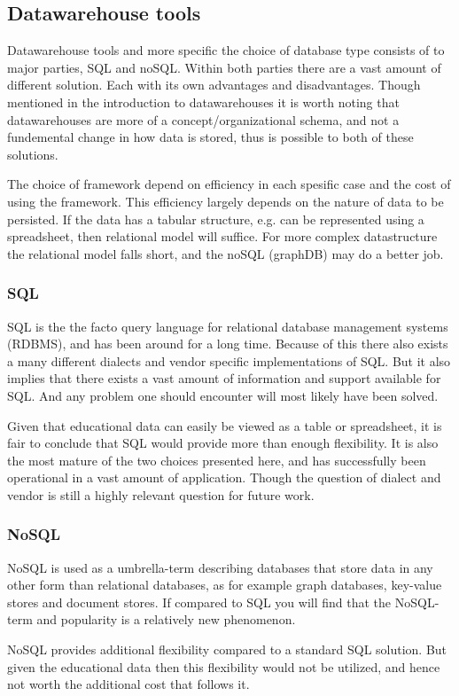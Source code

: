 \subsection{Datawarehouse tools}
Datawarehouse tools and more specific the choice of database type consists of to major parties, SQL and noSQL. 
Within both parties there are a vast amount of different solution. Each with its own advantages and disadvantages. 
Though mentioned in the introduction to datawarehouses it is worth noting that datawarehouses are more of a 
concept/organizational schema, and not a fundemental change in how data is stored, thus is possible to both of these solutions.

\bigskip\noindent
The choice of framework depend on efficiency in each spesific case and the cost of using the framework.
This efficiency largely depends on the nature of data to be persisted.
If the data has a tabular structure, e.g. can be represented using a spreadsheet, then relational model will suffice. 
For more complex datastructure the relational model falls short, and the noSQL (graphDB) may do a better job.

\subsubsection{SQL}
	SQL is the the facto query language for relational database management systems (RDBMS), and has been around for a long time. 
	Because of this there also exists a many different dialects and vendor specific implementations of SQL. 
	But it also implies that there exists a vast amount of information and support available for SQL. 
	And any problem one should encounter will most likely have been solved.
	
	\bigskip\noindent
	Given that educational data can easily be viewed as a table or spreadsheet, 
	it is fair to conclude that SQL would provide more than enough flexibility.
	It is also the most mature of the two choices presented here, and has successfully been operational in a vast amount of application.
	Though the question of dialect and vendor is still a highly relevant question for future work. 
	
	
\subsubsection{NoSQL}
	NoSQL is used as a umbrella-term describing databases that store data in any other form than relational databases, as 
	for example graph databases, key-value stores and document stores. 
	If compared to SQL you will find that the NoSQL-term and popularity is a relatively new phenomenon. 
	
	\bigskip\noindent
	NoSQL provides additional flexibility compared to a standard SQL solution. 
	But given the educational data then this flexibility would not be utilized, 
	and hence not worth the additional cost that follows it.





